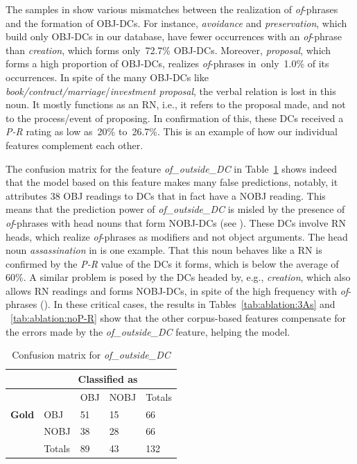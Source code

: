 \documentclass[output=paper]{langsci/langscibook}
\begin{document}
The samples  in  show various mismatches between the realization of \textit{of}-phrases and the formation of OBJ-DCs. For instance, \textit{avoidance} and \textit{preservation}, which build only OBJ-DCs in our database, have fewer occurrences with an \textit{of}-phrase than \textit{creation}, which forms only~72.7\% OBJ-DCs. Moreover, \textit{proposal}, which forms a high proportion of OBJ-DCs, realizes \textit{of}-phrases  in~only~1.0\% of its occurrences. In spite of the many OBJ-DCs like  \textit{book/contract/marriage}/\textit{investment proposal}, the verbal relation is lost in this noun. It mostly functions as an RN, i.e., it refers to the proposal made, and not to the process/event of proposing. In confirmation of this, these DCs received a \textit{P-R} rating as low as~20\% to~26.7\%.
This is an example of how our individual features complement each other. 

The confusion matrix for the feature \textit{of\_outside\_DC} in Table~\ref{tab:conf:of-outside} shows indeed that the model based on this feature makes many false predictions, notably, it attributes 38 OBJ readings to DCs that in fact have a NOBJ reading. This means that the prediction power of \textit{of\_outside\_DC} is misled by the presence of \textit{of}-phrases with head nouns that form NOBJ-DCs (see ). These DCs involve RN heads, which realize \textit{of}-phrases as modifiers and not object arguments. The head noun \textit{assassination} in  is one example. That this noun behaves like a RN is confirmed by the \textit{P-R} value of the DCs it forms, which is below the average of 60\%. A similar problem is posed by the DCs headed by, e.g., \textit{creation}, which also allows RN readings and forms NOBJ-DCs, in spite of the high frequency with \textit{of}-phrases (). In these critical cases, the results in Tables~\ref{tab:ablation:3As} and ~\ref{tab:ablation:noP-R} show that the other corpus-based features compensate for the errors made by the \textit{of\_outside\_DC} feature, helping the model.


\begin{table}
\caption{\label{tab:conf:of-outside} Confusion matrix for \textit{of\_outside\_DC}}
{\footnotesize
\begin{tabular}{|l|l|l|l|l|}
\hline
&\multicolumn{4}{c|}{\textbf{Classified as}}\\
\hline
&&  OBJ&NOBJ&Totals \\   
\textbf{Gold} & OBJ &51 &15&66 \\
& NOBJ&38 & 28&66  \\\hline
&Totals&89 &43&132\\
\hline
\end{tabular}}
\end{table}
\end{document}
